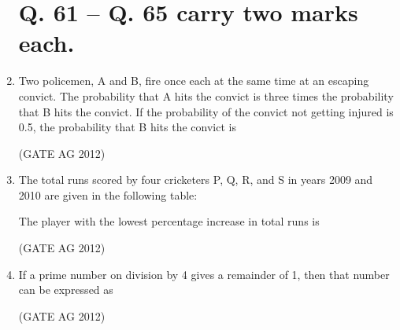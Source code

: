 \documentclass[journal]{IEEEtran}
\begin{document}
\begin{enumerate}
\medskip


\section*{Q. 61 -- Q. 65 carry two marks each.}

\item
 Two policemen, A and B, fire once each at the same time at an escaping convict. The probability that A hits the convict is three times the probability that B hits the convict. If the probability of the convict not getting injured is 0.5, the probability that B hits the convict is
\begin{enumerate}
\end{enumerate}
\hfill(GATE AG 2012)\\

\medskip

\item
 The total runs scored by four cricketers P, Q, R, and S in years 2009 and 2010 are given in the following table:



The player with the lowest percentage increase in total runs is
\begin{enumerate}
\end{enumerate}
\hfill(GATE AG 2012)\\

\medskip

\item
 If a prime number on division by 4 gives a remainder of 1, then that number can be expressed as
\begin{enumerate}
\end{enumerate}
\hfill(GATE AG 2012)\\


\end{enumerate}
\end{document}
